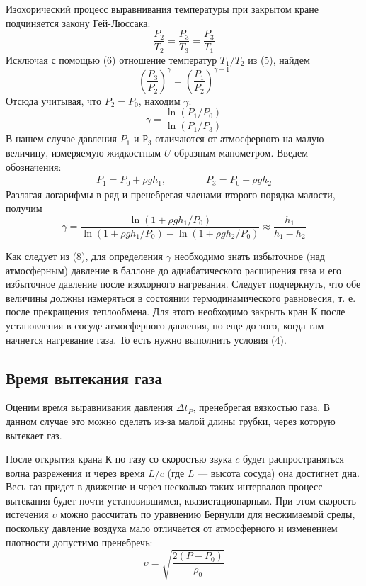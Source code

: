 \documentclass[a4paper,12pt]{article}
\theoremstyle{plain} %
\theoremstyle{definition} %
\theoremstyle{remark} %
\begin{document}
Изохорический процесс выравнивания температуры при закрытом кране подчиняется закону Гей-Люссака:
\begin{equation}
\frac{P_2}{T_2} = \frac{P_3}{T_3} = \frac{P_3}{T_1}
\end{equation}
Исключая с помощью (6) отношение температур $T_1/T_2$ из (5), найдем
\[ \left( \frac{P_3}{P_2} \right)^{\gamma} = \left( \frac{P_1}{P_2} \right) ^ {\gamma - 1} \]
Отсюда учитывая, что $P_2 = P_0$, находим $\gamma$:
\begin{equation}
\gamma = \frac{\ln (P_1/P_0)}{\ln (P_1/P_3)}
\end{equation}
В нашем случае давления $P_1$ и $Р_3$ отличаются от атмосферного на малую величину, измеряемую жидкостным $U$-образным манометром. Введем обозначения:
\begin{equation*}
\begin{aligned}
P_1 = P_0 + \rho g h_1, & & & & &P_3 = P_0 + \rho g h_2
\end{aligned}
\end{equation*}
Разлагая логарифмы в ряд и пренебрегая членами второго порядка малости, получим
\begin{equation}
\gamma = \frac{\ln (1 + \rho g h_1/P_0)}{\ln (1+ \rho g h_1/P_0) - \ln(1 + \rho g h_2/P_0)} \approx \frac{h_1}{h_1-h_2}
\end{equation}

Как следует из (8), для определения $\gamma$ необходимо знать избыточное (над атмосферным) давление в баллоне до адиабатического расширения газа и его избыточное давление после изохорного нагревания. Следует подчеркнуть, что обе величины должны измеряться в состоянии термодинамического равновесия, т. е. после прекращения теплообмена. Для этого необходимо закрыть кран $\text{К}$ после установления в сосуде атмосферного давления, но еще до того, когда там начнется нагревание газа. То есть нужно выполнить условия (4).

\subsection{Время вытекания газа}
Оценим время выравнивания давления $\Delta t_P$, пренебрегая вязкостью газа. В данном случае это можно сделать из-за малой длины трубки, через которую вытекает газ.

После открытия крана $\text{К}$ по газу со скоростью звука $c$ будет распространяться волна разрежения и через время $L/c$ (где $L$ — высота сосуда) она достигнет дна. Весь газ придет в движение и через несколько таких интервалов процесс вытекания будет почти установившимся, квазистационарным. При этом скорость истечения $\upsilon$ можно рассчитать по уравнению Бернулли для несжимаемой среды, поскольку давление воздуха мало отличается от атмосферного и изменением плотности допустимо пренебречь:
\[ \upsilon = \sqrt{\frac{2(P - P_0)}{\rho_0}}\]
\end{document}

